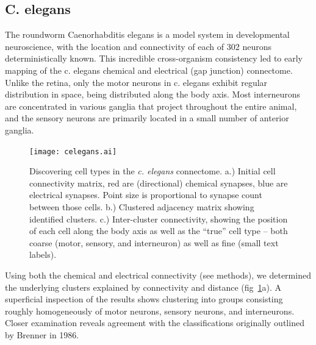 \documentclass{article}
\begin{document}


\subsection{C. elegans}

The roundworm Caenorhabditis elegans is a model system in
developmental neuroscience\autocite{White1986}, with the location and
connectivity of each of 302 neurons deterministically known. This
incredible cross-organism consistency led to early mapping of the
c. elegans chemical and electrical (gap junction) connectome. Unlike
the retina, only the motor neurons in c. elegans exhibit regular
distribution in space, being distributed along the body axis. Most
interneurons are concentrated in various ganglia that project
throughout the entire animal, and the sensory neurons are primarily
located in a small number of anterior ganglia. 

\begin{figure}
  \centering 
  \centerline{\texttt{[image: celegans.ai]}}
  \caption{Discovering cell types in the \textit{c. elegans}
    connectome. a.) Initial cell connectivity matrix, red are
    (directional) chemical synapses, blue are electrical
    synapses. Point size is proportional to synapse count between
    those cells. b.) Clustered adjacency matrix showing identified
    clusters. c.) Inter-cluster connectivity, showing the position of
    each cell along the body axis as well as the ``true'' cell type --
    both coarse (motor, sensory, and interneuron) as well as fine
    (small text labels). }
  \label{fig:celegans}
\end{figure}

Using both the chemical and electrical connectivity (see methods), we
determined the underlying clusters explained by connectivity and
distance (fig~\ref{fig:celegans}a). A superficial inspection of the results shows
clustering into groups consisting roughly homogeneously of motor
neurons, sensory neurons, and interneurons. Closer examination reveals
agreement with the classifications originally outlined by Brenner in
1986.  
\end{document}
